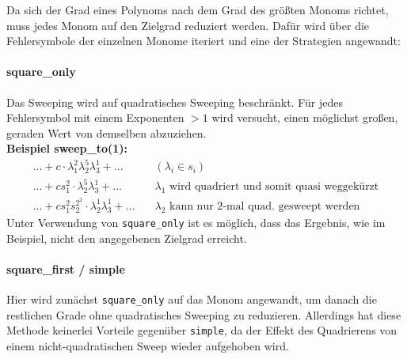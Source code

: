 Da sich der Grad eines Polynoms nach dem Grad des größten Monoms richtet, muss jedes Monom auf den Zielgrad reduziert werden. Dafür wird über die Fehlersymbole der einzelnen Monome iteriert und eine der Strategien angewandt:

\paragraph{square\_only}
Das Sweeping wird auf quadratisches Sweeping beschränkt. Für jedes Fehlersymbol mit einem Exponenten $> 1$ wird versucht, einen möglichst großen, geraden Wert von demselben abzuziehen. \\
\textbf{Beispiel sweep\_to(1):}
\begin{align*}
   ...+ c \cdot \lambda_1^2 \lambda_2^5 \lambda_3^1 +... & \quad (\lambda_i \in s_i) \\
    ...+ cs_1^2 \cdot \lambda_2^5 \lambda_3^1 +... & \quad \lambda_1 \text{ wird quadriert und somit quasi weggekürzt} \\
    ...+ cs_1^2s_2^{2^2} \cdot \lambda_2^1 \lambda_3^1 +... & \quad \lambda_2 \text{ kann nur 2-mal quad. gesweept werden}
\end{align*}
Unter Verwendung von \verb+square_only+ ist es möglich, dass das Ergebnis, wie im Beispiel, nicht den angegebenen Zielgrad erreicht. 


\paragraph{square\_first / simple}
Hier wird zunächst \verb+square_only+ auf das Monom angewandt, um danach die restlichen Grade ohne quadratisches Sweeping zu reduzieren. Allerdings hat diese Methode keinerlei Vorteile gegenüber \verb+simple+, da der Effekt des Quadrierens von einem nicht-quadratischen Sweep wieder aufgehoben wird.




% 
% 
